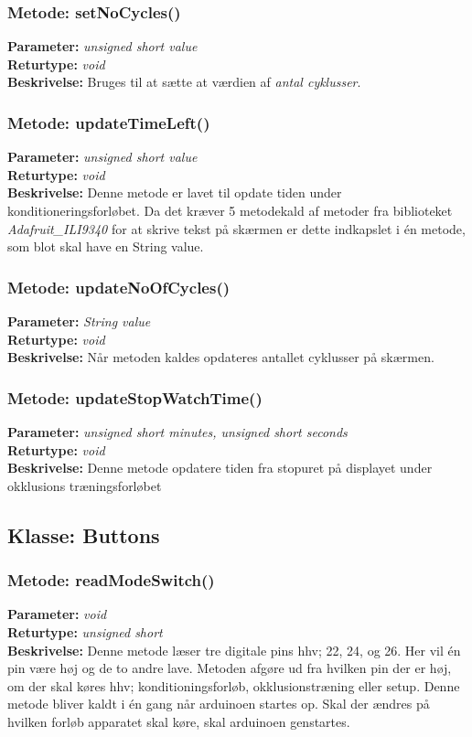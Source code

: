 \subsubsection{Metode: setNoCycles()}
\textbf{Parameter: } \textit{unsigned short value}
\\ \textbf{Returtype: } \textit{void}
\\ \textbf{Beskrivelse: } Bruges til at sætte at værdien af \textit{antal cyklusser}. 

\subsubsection{Metode: updateTimeLeft()}
\textbf{Parameter: } \textit{unsigned short value}
\\ \textbf{Returtype: } \textit{void}
\\ \textbf{Beskrivelse: } Denne metode er lavet til opdate tiden under konditioneringsforløbet. Da det kræver 5 metodekald af metoder fra biblioteket \textit{Adafruit\_ILI9340} for at skrive tekst på skærmen er dette indkapslet i én metode, som blot skal have en String value. 

\subsubsection{Metode: updateNoOfCycles()}
\textbf{Parameter: } \textit{String value}
\\ \textbf{Returtype: } \textit{void}
\\ \textbf{Beskrivelse: } Når metoden kaldes opdateres antallet cyklusser på skærmen. 

\subsubsection{Metode: updateStopWatchTime()}
\textbf{Parameter: } \textit{unsigned short minutes, unsigned short seconds}
\\ \textbf{Returtype: } \textit{void}
\\ \textbf{Beskrivelse: } Denne metode opdatere tiden fra stopuret på displayet under okklusions træningsforløbet 

\subsection{Klasse: Buttons}

\subsubsection{Metode: readModeSwitch()}
\textbf{Parameter: } \textit{void}
\\ \textbf{Returtype: } \textit{unsigned short}
\\ \textbf{Beskrivelse: } Denne metode læser tre digitale pins hhv; 22, 24, og 26. Her vil én pin være høj og de to andre lave. Metoden afgøre ud fra hvilken pin der er høj, om der skal køres hhv; konditioningsforløb, okklusionstræning eller setup. Denne metode bliver kaldt i én gang når arduinoen startes op. Skal der ændres på hvilken forløb apparatet skal køre, skal arduinoen genstartes. 

